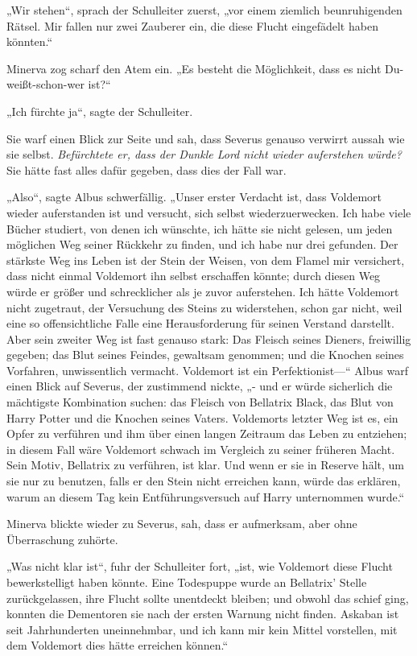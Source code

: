 {„Wir stehen“, sprach der Schulleiter zuerst, „vor einem ziemlich beunruhigenden Rätsel. Mir fallen nur zwei Zauberer ein, die diese Flucht eingefädelt haben könnten.“

Minerva zog scharf den Atem ein. „Es besteht die Möglichkeit, dass es nicht Du-weißt-schon-wer ist?“

„Ich fürchte ja“, sagte der Schulleiter.

Sie warf einen Blick zur Seite und sah, dass Severus genauso verwirrt aussah wie sie selbst. \emph{Befürchtete er, dass der Dunkle Lord nicht wieder auferstehen würde?} Sie hätte fast alles dafür gegeben, dass dies der Fall war.

„Also“, sagte Albus schwerfällig. „Unser erster Verdacht ist, dass Voldemort wieder auferstanden ist und versucht, sich selbst wiederzuerwecken. Ich habe viele Bücher studiert, von denen ich wünschte, ich hätte sie nicht gelesen, um jeden möglichen Weg seiner Rückkehr zu finden, und ich habe nur drei gefunden. Der stärkste Weg ins Leben ist der Stein der Weisen, von dem Flamel mir versichert, dass nicht einmal Voldemort ihn selbst erschaffen könnte; durch diesen Weg würde er größer und schrecklicher als je zuvor auferstehen. Ich hätte Voldemort nicht zugetraut, der Versuchung des Steins zu widerstehen, schon gar nicht, weil eine so offensichtliche Falle eine Herausforderung für seinen Verstand darstellt. Aber sein zweiter Weg ist fast genauso stark: Das Fleisch seines Dieners, freiwillig gegeben; das Blut seines Feindes, gewaltsam genommen; und die Knochen seines Vorfahren, unwissentlich vermacht. Voldemort ist ein Perfektionist—“ Albus warf einen Blick auf Severus, der zustimmend nickte, „- und er würde sicherlich die mächtigste Kombination suchen: das Fleisch von Bellatrix Black, das Blut von Harry Potter und die Knochen seines Vaters. Voldemorts letzter Weg ist es, ein Opfer zu verführen und ihm über einen langen Zeitraum das Leben zu entziehen; in diesem Fall wäre Voldemort schwach im Vergleich zu seiner früheren Macht. Sein Motiv, Bellatrix zu verführen, ist klar. Und wenn er sie in Reserve hält, um sie nur zu benutzen, falls er den Stein nicht erreichen kann, würde das erklären, warum an diesem Tag kein Entführungsversuch auf Harry unternommen wurde.“

Minerva blickte wieder zu Severus, sah, dass er aufmerksam, aber ohne Überraschung zuhörte.

„Was nicht klar ist“, fuhr der Schulleiter fort, „ist, wie Voldemort diese Flucht bewerkstelligt haben könnte. Eine Todespuppe wurde an Bellatrix' Stelle zurückgelassen, ihre Flucht sollte unentdeckt bleiben; und obwohl das schief ging, konnten die Dementoren sie nach der ersten Warnung nicht finden. Askaban ist seit Jahrhunderten uneinnehmbar, und ich kann mir kein Mittel vorstellen, mit dem Voldemort dies hätte erreichen können.“

}
